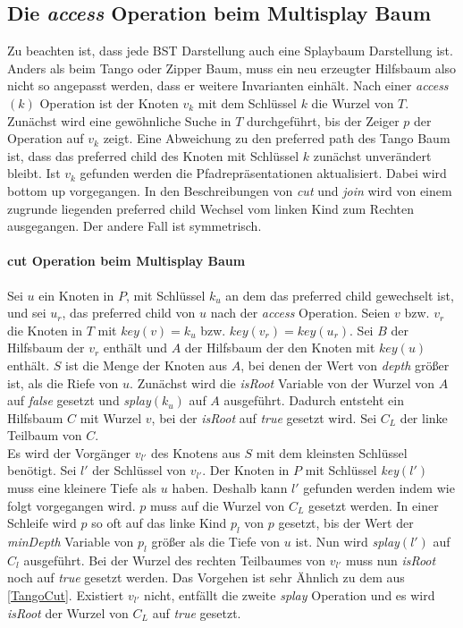 \documentclass[a4paper,12pt]{article}
\begin{document}
 \subsection{Die \textit{access} Operation beim Multisplay Baum}
 Zu beachten ist, dass jede BST Darstellung auch eine Splaybaum Darstellung ist. Anders als beim Tango oder Zipper Baum, muss ein neu erzeugter Hilfsbaum also nicht so angepasst werden, dass er weitere Invarianten einhält.  Nach einer \textit{access}$\left(k\right)$ Operation ist der Knoten $v_k$ mit dem Schlüssel $k$ die Wurzel von $T$. Zunächst wird eine gewöhnliche Suche in $T$ durchgeführt, bis der Zeiger $p$ der Operation auf $v_k$ zeigt. Eine Abweichung zu den preferred path des Tango Baum ist, dass das preferred child des Knoten mit Schlüssel $k$ zunächst unverändert bleibt. Ist $v_k$ gefunden werden die Pfadrepräsentationen aktualisiert. Dabei wird bottom up vorgegangen. In den Beschreibungen von \textit{cut} und \textit{join} wird von einem zugrunde liegenden preferred child Wechsel vom linken Kind zum Rechten ausgegangen. Der andere Fall ist symmetrisch.   \\ 

 
\paragraph{cut Operation beim Multisplay Baum}
 Sei $u$ ein Knoten in $P$, mit Schlüssel $k_u$ an dem das preferred child gewechselt ist, und sei $u_r$, das preferred child von $u$ nach der \textit{access} Operation. Seien $v$ bzw. $v_r$ die Knoten in $T$ mit $\mathit{key}\left(v\right) =k_u$ bzw.  $\mathit{key}\left(v_r\right) = \mathit{key}\left(u_r\right)$. Sei $B$ der Hilfsbaum der $v_r$ enthält und $A$ der Hilfsbaum der den Knoten mit  $\mathit{key}\left(u\right)$ enthält. $S$ ist die Menge der Knoten aus $A$, bei denen der Wert von \textit{depth} größer ist, als die Riefe von $u$.
Zunächst wird die \textit{isRoot} Variable von der Wurzel von $A$ auf \textit{false} gesetzt und \textit{splay}$\left(k_u\right)$ auf $A$ ausgeführt. Dadurch entsteht ein Hilfsbaum $C$ mit Wurzel $v$, bei der \textit{isRoot} auf \textit{true} gesetzt wird. Sei $C_L$ der linke Teilbaum von $C$.\\
 Es wird der  Vorgänger $v_{l'}$ des Knotens aus $S$ mit dem kleinsten Schlüssel benötigt. Sei $l'$ der Schlüssel von $v_{l'}$. Der Knoten in $P$ mit Schlüssel \textit{key}$\left(l'\right)$ muss eine kleinere Tiefe als $u$ haben. Deshalb kann $l'$ gefunden werden indem  wie folgt vorgegangen wird. $p$ muss auf die Wurzel von $C_L$ gesetzt werden. In einer Schleife wird $p$ so oft auf das linke Kind $p_l$ von $p$ gesetzt, bis der Wert der \textit{minDepth} Variable von $p_l$ größer als die Tiefe von $u$ ist.
 Nun wird \textit{splay}$\left(l'\right)$ auf $C_l$ ausgeführt.
 Bei der Wurzel des rechten Teilbaumes von $v_{l'}$ muss nun \textit{isRoot} noch auf \textit{true} gesetzt werden. Das Vorgehen ist sehr Ähnlich zu dem aus \ref{TangoCut}. Existiert  $v_{l'}$ nicht, entfällt die zweite \textit{splay} Operation und es wird \textit{isRoot} der Wurzel von $C_L$ auf \textit{true} gesetzt.  
\end{document}
